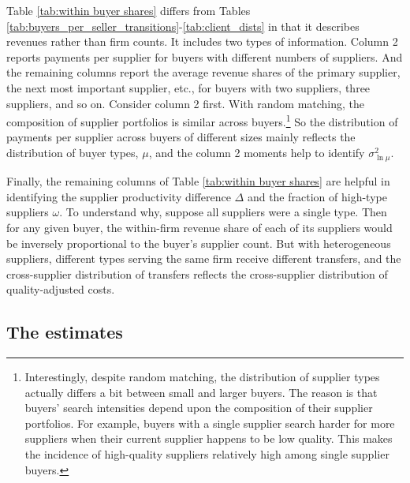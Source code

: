 \documentclass[12pt]{article} \usepackage{amsmath,amssymb,amsthm,geometry,graphicx,setspace,algorithm,algpseudocode,float}
\begin{document}
Table \ref{tab:within buyer shares} differs from Tables \ref{tab:buyers_per_seller_transitions}-\ref{tab:client_dists} in that it describes revenues rather than firm counts. It includes two types of information. Column 2 reports payments per supplier for buyers with different numbers of suppliers. And the remaining columns report the average revenue shares of the primary supplier, the next most important supplier, etc., for buyers with two suppliers, three suppliers, and so on. Consider column 2 first. With random matching, the composition of supplier portfolios is similar across buyers.\footnote{Interestingly, despite random matching, the distribution of supplier types actually differs a bit between small and larger buyers. The reason is that buyers' search intensities depend upon the composition of their supplier portfolios. For example, buyers with a single supplier search harder for more suppliers when their current supplier happens to be low quality. This makes the incidence of high-quality suppliers relatively high among single supplier buyers.\medskip}  So the distribution of payments per supplier across buyers of different sizes mainly reflects the distribution of buyer types, $\mu$, and the column 2 moments help to identify $\sigma^2_{\ln \mu}$. 
\par
Finally, the remaining columns of Table \ref{tab:within buyer shares} are helpful in identifying the supplier productivity difference $\Delta$ and the fraction of high-type suppliers $\omega$.  To understand why, suppose all suppliers were a single type. Then for any given buyer, the within-firm revenue share of each of  its suppliers would be inversely proportional to the buyer's supplier count. But with heterogeneous suppliers, different types serving the same firm receive different transfers, and the cross-supplier distribution of transfers reflects the cross-supplier distribution of quality-adjusted costs.

\subsection{The estimates}
\end{document}
